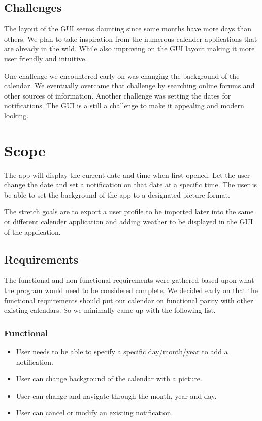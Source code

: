 \documentclass[10pt,conference,onecolumn,compsoc]{IEEEtran}
\begin{document}
\subsection{Challenges}
The layout of the GUI seems daunting since some months have more days than others. We plan to take inspiration from the numerous calender applications that are already in the wild. While also improving on the GUI layout making it more user friendly and intuitive.

One challenge we encountered early on was changing the background of the calendar. We eventually overcame that challenge by searching online forums and other sources of information. Another challenge was setting the dates for notifications. The GUI is a still a challenge to make it appealing and modern looking.

\section{Scope}
The app will display the current date and time when first opened. Let the user change the date and set a notification on that date at a specific time. The user is be able to set the background of the app to a designated picture format. 

The stretch goals are to export a user profile to be imported later into the same or different calender application and adding weather to be displayed in the GUI of the application.

\subsection{Requirements}
The functional and non-functional requirements were gathered based upon what the program would need to be considered complete. We decided early on that the functional requirements should put our calendar on functional parity with other existing calendars. So we minimally came up with the following list.

\subsubsection{Functional}
\begin{itemize}
\item User needs to be able to specify a specific day/month/year to add a notification.
\item User can change background of the calendar with a picture.
\item User can change and navigate through the month, year and day.
\item User can cancel or modify an existing notification.
\end{itemize}
\end{document}

